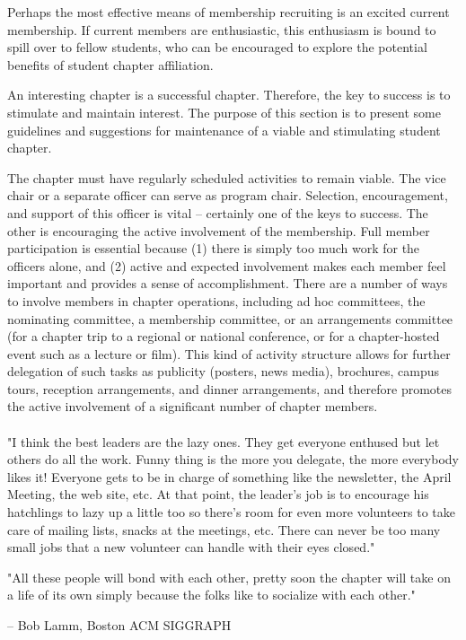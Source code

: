 Perhaps the most effective means of membership recruiting is an excited current
membership. If current members are enthusiastic, this enthusiasm is bound to
spill over to fellow students, who can be encouraged to explore the potential
benefits of student chapter affiliation.

An interesting chapter is a successful chapter. Therefore, the key to success is
to stimulate and maintain interest. The purpose of this section is to present
some guidelines and suggestions for maintenance of a viable and stimulating
student chapter.

The chapter must have regularly scheduled activities to remain viable. The vice
chair or a separate officer can serve as program chair. Selection, encouragement,
and support of this officer is vital -- certainly one of the keys to success.
The other is encouraging the active involvement of the membership. Full member
participation is essential because (1) there is simply too much work for the
officers alone, and (2) active and expected involvement makes each member feel
important and provides a sense of accomplishment. There are a number of ways to
involve members in chapter operations, including ad hoc committees, the
nominating committee, a membership committee, or an arrangements committee
(for a chapter trip to a regional or national conference, or for a chapter-hosted
event such as a lecture or film). This kind of activity structure allows for
further delegation of such tasks as publicity (posters, news media), brochures,
campus tours, reception arrangements, and dinner arrangements, and therefore
promotes the active involvement of a significant number of chapter members.
\\
\\
"I think the best leaders are the lazy ones. They get everyone enthused but let
others do all the work. Funny thing is the more you delegate, the more everybody
likes it! Everyone gets to be in charge of something like the newsletter, the
April Meeting, the web site, etc. At that point, the leader's job is to
encourage his hatchlings to lazy up a little too so there's room for even more
volunteers to take care of mailing lists, snacks at the meetings, etc. There can
never be too many small jobs that a new volunteer can handle with their eyes
closed."

"All these people will bond with each other, pretty soon the chapter will take
on a life of its own simply because the folks like to socialize with each other."

-- Bob Lamm, Boston ACM SIGGRAPH

